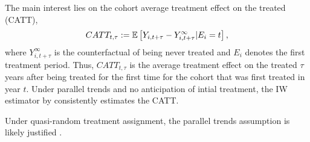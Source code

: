 The main interest lies on the cohort average treatment effect on the treated (CATT),
\begin{align*}
	CATT_{t, \tau} := \mathbb{E} \left[ Y_{i, t+\tau} - Y_{i, t+\tau}^{\infty} | E_i = t \right],
\end{align*}
where $Y_{i, t+\tau}^{\infty}$ is the counterfactual of being never treated and $E_i$ denotes the first treatment period. Thus, $CATT_{t, \tau}$ is the average treatment effect on the treated $\tau$ years after being treated for the first time for the cohort that was first treated in year $t$. Under parallel trends and no anticipation of intial treatment, the IW estimator by \cite{Sun_2021} consistently estimates the CATT.

Under quasi-random treatment assignment, the parallel trends assumption is likely justified \citep{Roth_2022}. 



